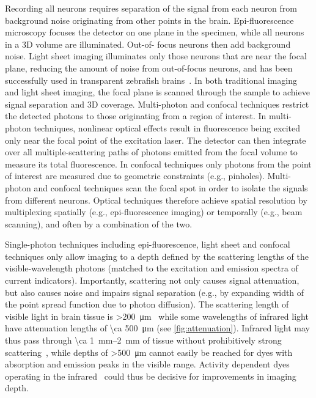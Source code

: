 Recording all neurons requires separation of the signal from each neuron from background noise originating from other points in the brain.
Epi-fluorescence microscopy focuses the detector on one plane in the specimen, while all neurons in a 3D volume are illuminated.
Out-of- focus neurons then add background noise.
Light sheet imaging illuminates only those neurons that are near the focal plane, reducing the amount of noise from out-of-focus neurons, and has been successfully used in transparent zebrafish brains~\cite{ahrens13}.
In both traditional imaging and light sheet imaging, the focal plane is scanned through the sample to achieve signal separation and 3D coverage.
Multi-photon and confocal techniques restrict the detected photons to those originating from a region of interest.
In multi-photon techniques, nonlinear optical effects result in fluorescence being excited only near the focal point of the excitation laser.
The detector can then integrate over all multiple-scattering paths of photons emitted from the focal volume to measure its total fluorescence.
In confocal techniques only photons from the point of interest are measured due to geometric constraints (e.g., pinholes).
Multi-photon and confocal techniques scan the focal spot in order to isolate the signals from different neurons.
Optical techniques therefore achieve spatial resolution by multiplexing spatially (e.g., epi-fluorescence imaging) or temporally (e.g., beam scanning), and often by a combination of the two.

Single-photon techniques including epi-fluorescence, light sheet and confocal techniques only allow imaging to a depth defined by the scattering lengths of the visible-wavelength photons (matched to the excitation and emission spectra of current indicators).
Importantly, scattering not only causes signal attenuation, but also causes noise and impairs signal separation (e.g., by expanding width of the point spread function due to photon diffusion).
The scattering length of visible light in brain tissue is \SI{>200}{\micro\meter}~\cite{horton13} while some wavelengths of infrared light have attenuation lengths of \SI{\ca 500}{\micro\meter} (see \autoref{fig:attenuation}).
Infrared light may thus pass through \SIrange{\ca 1}{2}{\milli\meter} of tissue without prohibitively strong scattering~\cite{horton13,kobat09}, while depths of \SI{>500}{\micro\meter} cannot easily be reached for dyes with absorption and emission peaks in the visible range.
Activity dependent dyes operating in the infrared~\cite{filonov11,shcherbakova13} could thus be decisive for improvements in imaging depth.

